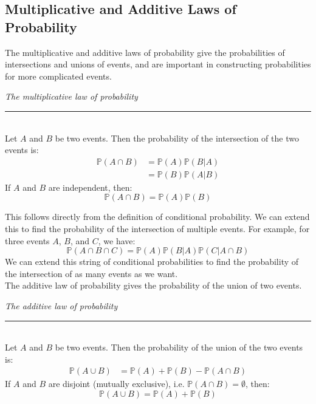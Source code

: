 \documentclass[12pt]{article}
\theoremstyle{definition}
\theoremstyle{remark}
\def\P{{\mathbb P}}
\begin{document}
\subsection{Multiplicative and Additive Laws of Probability}
The multiplicative and additive laws of probability give the probabilities of intersections and unions of events, and are important in constructing probabilities for more complicated events.

\begin{framed}
\emph{The multiplicative law of probability}\\
  \rule{\dimexpr{}\fboxrule}{.1pt} \\
Let $A$ and $B$ be two events. Then the probability of the intersection of the two events is:
\begin{align*}
\P(A \cap B) &= \P(A)\P(B|A) \\
&= \P(B)\P(A|B)
\end{align*}
If $A$ and $B$ are independent, then:
\[
\P(A \cap B) = \P(A)\P(B)
\]
\end{framed}
This follows directly from the definition of conditional probability. We can extend this to find the probability of the intersection of multiple events. For example, for three events $A$, $B$, and $C$, we have:
\[
\P(A \cap B \cap C) = \P(A)\P(B|A)\P(C|A\cap B)
\]
We can extend this string of conditional probabilities to find the probability of the intersection of as many events as we want. \\



The additive law of probability gives the probability of the union of two events.
\begin{framed}
\emph{The additive law of probability}\\
  \rule{\dimexpr{}\fboxrule}{.1pt} \\
Let $A$ and $B$ be two events. Then the probability of the union of the two events is:
\begin{align*}
\P(A \cup B) &= \P(A) + \P(B) - \P(A \cap B) 
\end{align*}
If $A$ and $B$ are disjoint (mutually exclusive), i.e. $\P(A \cap B) = \emptyset$, then:
\[
\P(A \cup B) = \P(A) + \P(B)
\]
\end{framed}
\end{document}

